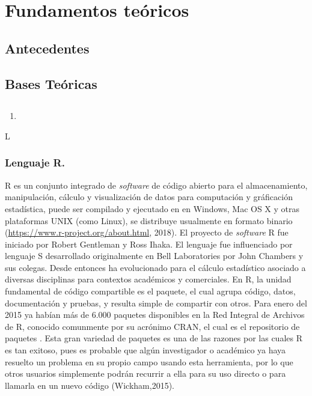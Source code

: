 \chapter{Fundamentos te\'oricos}

\section{Antecedentes}




\section{Bases Te\'oricas}

\section{}




\begin{enumerate}
  \item 
\end{enumerate}

L
\subsection{Lenguaje R.}



R es un conjunto  integrado de \textit{software} de código abierto para el almacenamiento, manipulación, cálculo y visualización de datos para computación y gráficación estadística, puede ser compilado y ejecutado en  en Windows, Mac OS X y otras  plataformas UNIX (como Linux), se distribuye usualmente en formato binario (\url{https://www.r-project.org/about.html}, 2018). El proyecto de \emph{software} R fue iniciado por Robert Gentleman y Ross Ihaka. El lenguaje fue influenciado por  lenguaje S desarrollado originalmente en Bell Laboratories por John Chambers y sus colegas. Desde entonces ha evolucionado  para el cálculo estadístico asociado a diversas disciplinas para contextos académicos y comerciales. En R, la unidad fundamental de código compartible es el paquete, el cual agrupa código, datos, documentación y pruebas, y resulta simple de compartir con otros. Para enero del 2015 ya habían más de 6.000 paquetes disponibles en la Red Integral de Archivos de R, conocido comunmente por su acrónimo CRAN, el cual es el repositorio de paquetes . Esta gran variedad de paquetes es una de las razones por las cuales R es tan exitoso, pues es probable que algún investigador o académico ya haya resuelto un problema en su propio campo usando esta herramienta, por lo que otros usuarios simplemente podrán recurrir a ella para su uso directo o para llamarla en un nuevo código (Wickham,2015). \\


